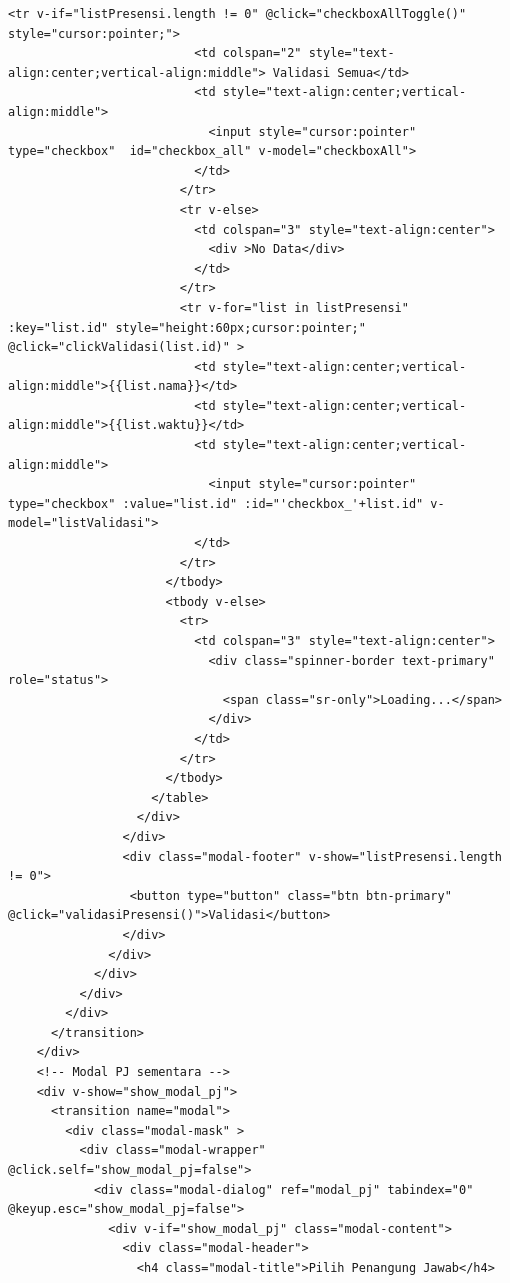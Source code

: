 \begin{lstlisting}[breaklines]
                        <tr v-if="listPresensi.length != 0" @click="checkboxAllToggle()" style="cursor:pointer;">
                          <td colspan="2" style="text-align:center;vertical-align:middle"> Validasi Semua</td>
                          <td style="text-align:center;vertical-align:middle">
                            <input style="cursor:pointer" type="checkbox"  id="checkbox_all" v-model="checkboxAll">
                          </td>
                        </tr>
                        <tr v-else>
                          <td colspan="3" style="text-align:center">
                            <div >No Data</div>
                          </td>
                        </tr>
                        <tr v-for="list in listPresensi" :key="list.id" style="height:60px;cursor:pointer;" @click="clickValidasi(list.id)" >
                          <td style="text-align:center;vertical-align:middle">{{list.nama}}</td>
                          <td style="text-align:center;vertical-align:middle">{{list.waktu}}</td>
                          <td style="text-align:center;vertical-align:middle">
                            <input style="cursor:pointer" type="checkbox" :value="list.id" :id="'checkbox_'+list.id" v-model="listValidasi">
                          </td>
                        </tr>
                      </tbody>
                      <tbody v-else>
                        <tr>
                          <td colspan="3" style="text-align:center">
                            <div class="spinner-border text-primary" role="status">
                              <span class="sr-only">Loading...</span>
                            </div>
                          </td>
                        </tr>
                      </tbody>
                    </table>
                  </div>
                </div>
                <div class="modal-footer" v-show="listPresensi.length != 0">
                 <button type="button" class="btn btn-primary" @click="validasiPresensi()">Validasi</button>
                </div>
              </div>
            </div>
          </div>
        </div>
      </transition>
    </div>
    <!-- Modal PJ sementara -->
    <div v-show="show_modal_pj">
      <transition name="modal">
        <div class="modal-mask" >
          <div class="modal-wrapper" @click.self="show_modal_pj=false">
            <div class="modal-dialog" ref="modal_pj" tabindex="0" @keyup.esc="show_modal_pj=false">
              <div v-if="show_modal_pj" class="modal-content">
                <div class="modal-header">
                  <h4 class="modal-title">Pilih Penangung Jawab</h4>

\end{lstlisting}

